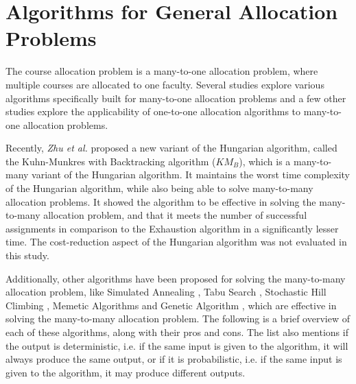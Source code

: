 \section{Algorithms for General Allocation Problems}

The course allocation problem is a many-to-one allocation problem, where multiple courses are allocated to one faculty. Several studies explore various algorithms specifically built for many-to-one allocation problems and a few other studies explore the applicability of one-to-one allocation algorithms to many-to-one allocation problems.

Recently, \textit{Zhu et al.} \cite{zhu2016solving} proposed a new variant of the Hungarian algorithm, called the Kuhn-Munkres with Backtracking algorithm ($KM_B$), which is a many-to-many variant of the Hungarian algorithm. It maintains the worst time complexity of the Hungarian algorithm, while also being able to solve many-to-many allocation problems. It showed the algorithm to be effective in solving the many-to-many allocation problem, and that it meets the number of successful assignments in comparison to the Exhaustion algorithm in a significantly lesser time. The cost-reduction aspect of the Hungarian algorithm was not evaluated in this study.

Additionally, other algorithms have been proposed for solving the many-to-many allocation problem, like Simulated Annealing \cite{bertsimas1993simulated}, Tabu Search \cite{glover1990tabu}, Stochastic Hill Climbing \cite{juels1995stochastic}, Memetic Algorithms \cite{neri2012memetic} and Genetic Algorithm \cite{lambora2019genetic}, which are effective in solving the many-to-many allocation problem. The following is a brief overview of each of these algorithms, along with their pros and cons. The list also mentions if the output is deterministic, i.e. if the same input is given to the algorithm, it will always produce the same output, or if it is probabilistic, i.e. if the same input is given to the algorithm, it may produce different outputs.

